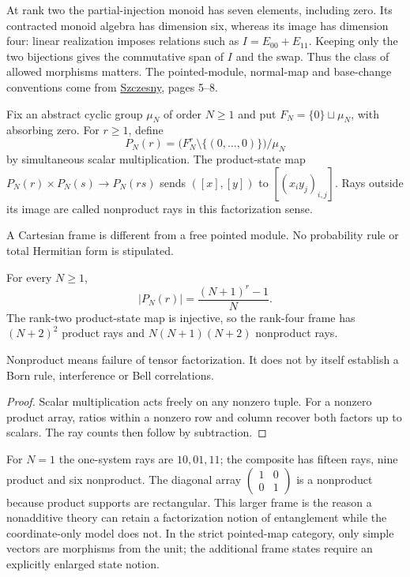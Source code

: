 At rank two the partial-injection monoid has seven elements, including
zero. Its contracted monoid algebra has dimension six, whereas its image
has dimension four: linear realization imposes relations such as
$I=E_{00}+E_{11}$. Keeping only the two bijections gives the commutative
span of $I$ and the swap. Thus the class of allowed morphisms matters.
The pointed-module, normal-map and base-change conventions come from
\href{https://arxiv.org/abs/1204.5395}{Szczesny}, pages 5--8.

\begin{definition}
Fix an abstract cyclic group $\mu_N$ of order $N\geq1$ and put
$F_N=\{0\}\sqcup\mu_N$, with absorbing zero. For $r\geq1$, define
\[
P_N(r)=\bigl(F_N^r\setminus\{(0,\ldots,0)\}\bigr)/\mu_N
\]
by simultaneous scalar multiplication. The product-state map
$P_N(r)\times P_N(s)\to P_N(rs)$ sends $([x],[y])$ to
$[(x_i y_j)_{i,j}]$. Rays outside its image are called nonproduct rays
in this factorization sense.
\end{definition}
\begin{scope}A Cartesian frame is different from a free pointed module.
No probability rule or total Hermitian form is stipulated.\end{scope}

\begin{proposition}
{\normalfont\statusSketch}\quad For every $N\geq1$,
\[
|P_N(r)|=\frac{(N+1)^r-1}{N}.
\]
The rank-two product-state map is injective, so the rank-four frame has
$(N+2)^2$ product rays and $N(N+1)(N+2)$ nonproduct rays.
\end{proposition}
\begin{scope}Nonproduct means failure of tensor factorization. It does not
by itself establish a Born rule, interference or Bell correlations.\end{scope}
\begin{proof}
Scalar multiplication acts freely on any nonzero tuple. For a nonzero
product array, ratios within a nonzero row and column recover both
factors up to scalars. The ray counts then follow by subtraction.
\end{proof}

For $N=1$ the one-system rays are $10,01,11$; the composite has fifteen
rays, nine product and six nonproduct. The diagonal array
$\left(\begin{smallmatrix}1&0\\0&1\end{smallmatrix}\right)$ is a nonproduct
because product supports are rectangular. This larger frame is the
reason a nonadditive theory can retain a factorization notion of
entanglement while the coordinate-only model does not. In the strict
pointed-map category, only simple vectors are morphisms from the unit;
the additional frame states require an explicitly enlarged state notion.

